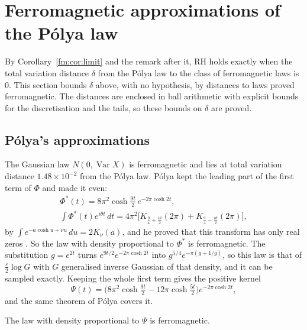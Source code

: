 \section{Ferromagnetic approximations of the P\'olya law}\label{ch:fmapprox}

By Corollary~\ref{fm:cor:limit} and the remark after it, RH holds exactly when the total variation distance $\delta$ from the P\'olya law to the class of ferromagnetic laws is $0$. This section bounds $\delta$ above, with no hypothesis, by distances to laws proved ferromagnetic. The distances are enclosed in ball arithmetic with explicit bounds for the discretisation and the tails, so these bounds on $\delta$ are proved.

\subsection{P\'olya's approximations}\label{fm:sec:simple}

The Gaussian law $N(0,\operatorname{Var}X)$ is ferromagnetic and lies at total variation distance $1.48\times10^{-2}$ from the P\'olya law. P\'olya kept the leading part of the first term of $\Phi$ and made it even:
\begin{gather*}
\Phi^*(t)=8\pi^2\cosh\tfrac{9t}2\,e^{-2\pi\cosh2t},\\
\int\Phi^*(t)e^{i\theta t}\,dt=4\pi^2\Big[K_{\frac94+\frac{i\theta}2}(2\pi)+K_{\frac94-\frac{i\theta}2}(2\pi)\Big],
\end{gather*}
by $\int e^{-a\cosh u+\nu u}\,du=2K_\nu(a)$, and he proved that this transform has only real zeros \cite{Polya}. So the law with density proportional to $\Phi^*$ is ferromagnetic. The substitution $g=e^{2t}$ turns $e^{9t/2}e^{-2\pi\cosh2t}$ into $g^{5/4}e^{-\pi(g+1/g)}$, so this law is that of $\frac\varepsilon2\log G$ with $G$ generalised inverse Gaussian of that density, and it can be sampled exactly. Keeping the whole first term gives the positive kernel
\[
\Psi(t)=\Big(8\pi^2\cosh\tfrac{9t}2-12\pi\cosh\tfrac{5t}2\Big)e^{-2\pi\cosh2t},
\]
and the same theorem of P\'olya covers it.

\begin{proposition}\label{fm:prop:psi}
The law with density proportional to $\Psi$ is ferromagnetic.
\end{proposition}

